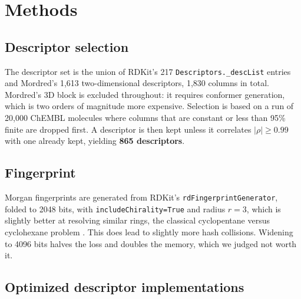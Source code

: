 \section{Methods}

\subsection{Descriptor selection}

The descriptor set is the union of RDKit's 217 \texttt{Descriptors.\_descList} entries and
Mordred's 1{,}613 two-dimensional descriptors, 1{,}830 columns in total. Mordred's 3D block is
excluded throughout: it requires conformer generation, which is two orders of magnitude more
expensive. Selection is based on a run of 20{,}000 ChEMBL molecules where columns that are
constant or less than 95\% finite are dropped first. A descriptor is then kept unless it
correlates $|\rho| \geq 0.99$ with one already kept, yielding \textbf{865 descriptors}.

\subsection{Fingerprint}

Morgan fingerprints are generated from RDKit's \texttt{rdFingerprintGenerator}, folded to 2048
bits, with \texttt{includeChirality=True} and radius $r=3$, which is slightly better at
resolving similar rings, the classical cyclopentane versus cyclohexane problem \cite{morgan}.
This does lead to slightly more hash collisions. Widening to 4096 bits halves the loss and
doubles the memory, which we judged not worth it.

\subsection{Optimized descriptor implementations}

